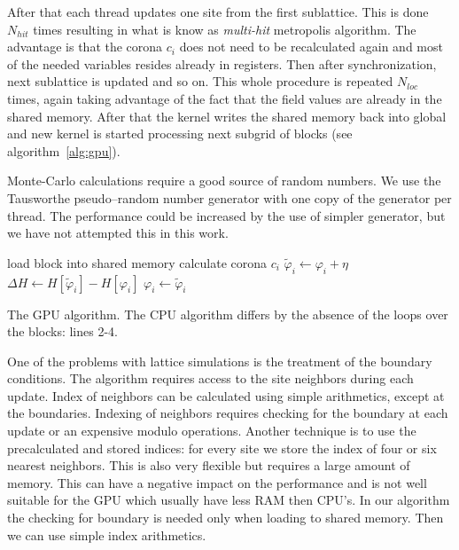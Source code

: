 \documentclass[a4paper]{llncs}
\newcommand{\vphi}{\varphi}
\begin{document}
After that each thread updates one site
from the first sublattice. This is done $N_{hit}$ times resulting in
what is know as {\em multi-hit} metropolis algorithm. The advantage is
that the corona $c_i$ does not need to be recalculated again and most
of the needed variables resides already in registers.  Then after
synchronization, next sublattice is updated and so on. This whole
procedure is repeated $N_{loc}$ times, again taking advantage of
the fact that the field values are already in the shared memory. After
that the kernel writes the shared memory back into global and new
kernel is started processing next subgrid of blocks (see
algorithm~\ref{alg:gpu}).

Monte-Carlo calculations require a good source of random numbers. We
use the Tausworthe pseudo--random number
generator\cite{howes_thomas07} with one copy of the generator per
thread. The performance could be increased by the use of simpler
generator, but we have not attempted this in this work.

\begin{algorithm}
\begin{algorithmic}[1]
\State load block  into shared memory
\State calculate corona $c_i$ 
\State $\widetilde{\vphi}_i \gets \vphi_i+\eta$
\State $\Delta H \gets H[\widetilde{\vphi}_i]-H[\vphi_i]$
\State $\vphi_i \gets \widetilde{\vphi}_i$
\EndIf
\EndFor
\EndFor 
{}
\EndFor
\EndFor
\EndFor
\EndFor
\end{algorithmic}
\caption{\label{alg:gpu} The GPU algorithm. The CPU algorithm differs by the absence of the loops over the blocks: lines 2-4.}
\end{algorithm}


One of the problems with lattice simulations is the treatment of the
boundary conditions. The algorithm requires access to the site
neighbors during each update. Index of neighbors can be calculated
using simple arithmetics, except at the boundaries. Indexing of
neighbors requires  checking for the boundary at each update or
an expensive modulo operations. Another technique is to use the
precalculated and stored indices: for every site we store the index of
four or six nearest neighbors. This is also very flexible but
requires a large amount of memory. This can have a negative impact on
the performance and is not well suitable for the GPU which usually
have less RAM then CPU's. In our algorithm the checking for boundary
is needed only when loading to shared memory. Then we can use simple
index arithmetics.
\end{document}
